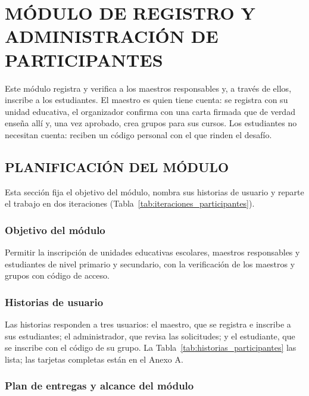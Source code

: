 \chapter{MÓDULO DE REGISTRO Y ADMINISTRACIÓN DE PARTICIPANTES}

Este módulo registra y verifica a los maestros responsables y, a través de ellos, inscribe a los estudiantes. El maestro es quien tiene cuenta: se registra con su unidad educativa, el organizador confirma con una carta firmada que de verdad enseña allí y, una vez aprobado, crea grupos para sus cursos. Los estudiantes no necesitan cuenta: reciben un código personal con el que rinden el desafío.

\section{PLANIFICACIÓN DEL MÓDULO}

Esta sección fija el objetivo del módulo, nombra sus historias de usuario y reparte el trabajo en dos iteraciones (Tabla~\ref{tab:iteraciones_participantes}).

\subsection{Objetivo del módulo}

Permitir la inscripción de unidades educativas escolares, maestros responsables y estudiantes de nivel primario y secundario, con la verificación de los maestros y grupos con código de acceso.

\subsection{Historias de usuario}

Las historias responden a tres usuarios: el maestro, que se registra e inscribe a sus estudiantes; el administrador, que revisa las solicitudes; y el estudiante, que se inscribe con el código de su grupo. La Tabla~\ref{tab:historias_participantes} las lista; las tarjetas completas están en el Anexo A.

{\estilotabla
}

\subsection{Plan de entregas y alcance del módulo}

